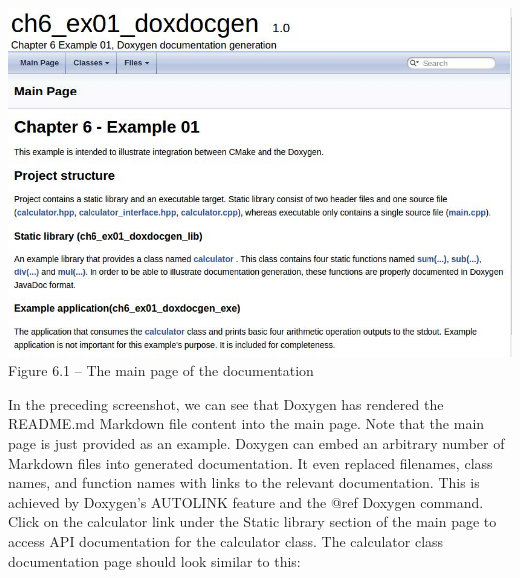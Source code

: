 \begin{center}
\includegraphics[width=1.\textwidth]{content/2/chapter6/images/1.jpg}\\
Figure 6.1 – The main page of the documentation
\end{center}

In the preceding screenshot, we can see that Doxygen has rendered the README.md Markdown file content into the main page. Note that the main page is just provided as an example. Doxygen can embed an arbitrary number of Markdown files into generated documentation. It even replaced filenames, class names, and function names with links to the relevant documentation. This is achieved by Doxygen's AUTOLINK feature and the @ref Doxygen command. Click on the calculator link under the Static library section of the main page to access API documentation for the calculator class. The calculator class documentation page should look similar to this:

